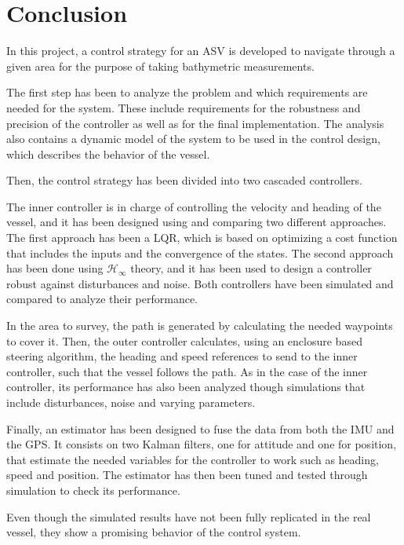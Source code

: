 \chapter{Conclusion}\label{chap:conclusion}

In this project, a control strategy for an ASV is developed to navigate through a given area for the purpose of taking bathymetric measurements.

The first step has been to analyze the problem and which requirements are needed for the system. These include requirements for the robustness and precision of the controller as well as for the final implementation. The analysis also contains a dynamic model of the system to be used in the control design, which describes the behavior of the vessel.

Then, the control strategy has been divided into two cascaded controllers. 

The inner controller is in charge of controlling the velocity and heading of the vessel, and it has been designed using and comparing two different approaches. The first approach has been a LQR, which is based on optimizing a cost function that includes the inputs and the convergence of the states. The second approach has been done using $\mathcal{H}_\infty$ theory, and it has been used to design a controller robust against disturbances and noise. Both controllers have been simulated and compared to analyze their performance.

In the area to survey, the path is generated by calculating the needed waypoints to cover it. Then, the outer controller calculates, using an enclosure based steering algorithm, the heading and speed references to send to the inner controller, such that the vessel follows the path. As in the case of the inner controller, its performance has also been analyzed though simulations that include disturbances, noise and varying parameters.

Finally, an estimator has been designed to fuse the data from both the IMU and the GPS. It consists on two Kalman filters, one for attitude and one for position, that estimate the needed variables for the controller to work such as heading, speed and position. The estimator has then been tuned and tested through simulation to check its performance.

Even though the simulated results have not been fully replicated in the real vessel, they show a promising behavior of the control system.

